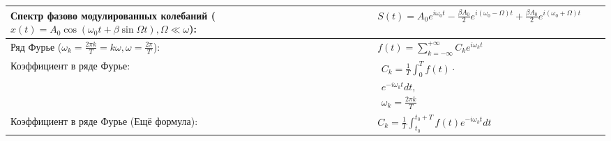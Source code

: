 \documentclass{article}
\begin{document}
\begin{tabular}{ |p{6cm}|p{3cm}|p{6cm}|p{3.5cm}|  }
\hline
Спектр фазово модулированных колебаний ($x(t)=A_{0} \cos \left(\omega_{0} t+\beta \sin \Omega t\right), \Omega \ll \omega$):&
$S(t)=A_{0} e^{i \omega_{0} t}-\frac{\beta A_{0}}{2} e^{i\left(\omega_{0}-\Omega\right) t}+\frac{\beta A_{0}}{2} e^{i\left(\omega_{0}+\Omega\right) t}$&
                                                                           &
                                                                           \\
\hline
Ряд Фурье ($\omega_{k}=\frac{2 \pi k}{T}=k \omega, \omega=\frac{2 \pi}{T}$):&
$f(t)=\sum_{k=-\infty}^{+\infty} C_{k} e^{i \omega_{k} t}$                 &
                                                                           &
                                                                           \\
\hline
Коэффициент в ряде Фурье:                                                  &
$\begin{aligned}
C_{k}=\frac{1}{T} \int_{0}^{T} f(t) \cdot  \\
 e^{-i \omega_{k} t} d t,                  \\
\omega_{k}=\frac{2 \pi k}{T}
\end{aligned}$                                                             &
                                                                           &
                                                                           \\
\hline
Коэффициент в ряде Фурье (Ещё формула):                                    &
$C_{k}=\frac{1}{T} \int_{t_{0}}^{t_{0}+T} f(t) e^{-i \omega_{k} t} d t$    &
                                                                           &
                                                                           \\
\hline
\end{tabular}
\end{document}
